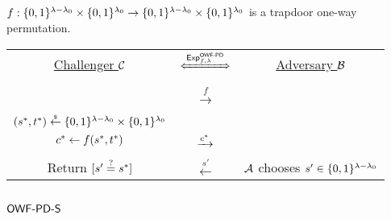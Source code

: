 \documentclass{article}
\begin{document}

\subsection{\owfpd}

$f: \{0, 1\}^{\lambda - \lambda_0} \times \{0, 1\}^{\lambda_0} \to \{0, 1\}^{\lambda -
\lambda_0} \times \{0, 1\}^{\lambda_0}$ is a trapdoor one-way permutation.

\begin{tcolorbox}[colback=white]
	\centering
	\begin{tabularx}{\linewidth}{CcC}
		\underline{Challenger $\mathcal{C}$} & 
		$\xLeftrightarrow{\Exp^{\owfpd}_{f, \sp}}$ & 
		\underline{Adversary $\mathcal{B}$} \\

		 \\

		 & 
		$\xrightarrow{f}$ & 
	   \\

		 \\

		$(s^*, t^*) \overset{{\scriptscriptstyle\$}}{\leftarrow} \{0, 1\}^{\lambda - \lambda_0} \times \{0, 1\}^{\lambda_0}$ \\
		$c^* \gets f(s^*, t^*)$ &
		$\xrightarrow{c^*}$ &
		 \\

		 \\

		Return $[s' \overset{?}{=} s^*]$ & 
		$\xleftarrow{s'}$ & 
		$\mathcal{A}$ chooses $s' \in \{0, 1\}^{\lambda - \lambda_0}$ \\
  \end{tabularx}
\end{tcolorbox}


\subsection{$\textsf{OWF-PD-S}$}
\end{document}
